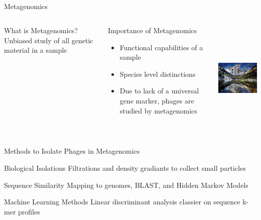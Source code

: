 \documentclass[11pt, xcolor=table]{beamer}
\begin{document}
\subsection{}
  \begin{frame}{Metagenomics}
	\begin{columns}
	\begin{block}{What is Metagenomics?}
	Unbiased study of all genetic material in a sample
	\end{block}
	\begin{block}{Importance of Metagenomics}
	\begin{itemize}
	\item Functional capabilities of a sample
	\item Species level distinctions
	\item Due to lack of a universal gene marker, phages are studied by metagenomics
	\end{itemize}
	\end{block}
	
	\includegraphics[height=5.5cm, width=5cm]{mosaic.png}
	\end{columns}
	\end{frame}

  \begin{frame}{Methods to Isolate Phages in Metagenomics}
  \begin{block}{Biological Isolations}
  Filtrations and density gradiants to collect small particles
  \end{block}
  \begin{block}{Sequence Similarity}
  Mapping to genomes, BLAST, and Hidden Markov Models
  \end{block}
  \begin{block}{Machine Learning Methods}
  Linear discriminant analysis classier on sequence k-mer profiles
  \end{block}
  \end{frame}
  
\end{document}
